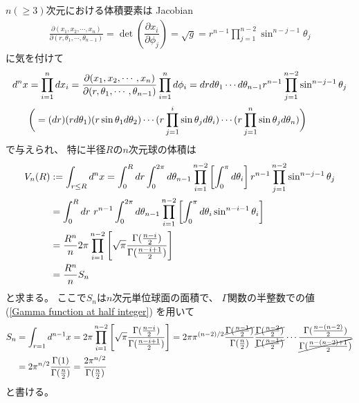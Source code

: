 $n (\ge 3)$次元における体積要素は
Jacobian
\begin{align}
    \frac{\partial(x_1, x_2, \cdots, x_n)}
    {\partial(r, \theta_1, \cdots, \theta_{n-1})}
=
    \det
\left(
    \dfrac{\partial x_i}{\partial \phi_j}
\right)
=
    \sqrt{ g }
=
    r^{n-1}
    \prod_{j = 1}^{n-2}
    \sin^{n - j - 1} \theta_j
\label{jacobian for spherical coordinates}
\end{align}
に気を付けて
\begin{align}
    d^n x
&=
    \prod_{i = 1}^n
    d x_i
=
    \frac{\partial(x_1, x_2, \cdots, x_n)}
    {\partial(r, \theta_1, \cdots, \theta_{n-1})}
    \prod_{i = 1}^n
    d \phi_i
=
    d r d \theta_1
        \cdots d \theta_{n-1}
    r^{n-1}
    \prod_{j = 1}^{n-2}
    \sin^{n - j - 1} \theta_j
\\\notag&
\bigg(
=
    (dr)
    (r d \theta_1)
    (r \sin \theta_1 d \theta_2)
\cdots
    (r \prod_{j = 1}^i
    \sin \theta_j d \theta_i)
\cdots
    (r \prod_{j = 1}^n
    \sin \theta_j d \theta_n)
\bigg)
\end{align}
で与えられ、
特に半径$R$の$n$次元球の体積は
\begin{align}
    V_n(R)
&:=
    \int_{r \le R} d^n x
=
    \int_0^R
        dr
    \int_0^{2 \pi}
        d \theta_{n-1}
    \prod_{i=1}^{n-2}
    \left[
        \int_0^{\pi}
            d \theta_i
    \right]
    r^{n-1}
    \prod_{j = 1}^{n-2}
    \sin^{n - j - 1} \theta_j
\notag\\&
=
    \int_0^R
        dr\ 
    r^{n-1}
    \int_0^{2 \pi}
        d \theta_{n-1}
    \prod_{i=1}^{n-2}
    \left[
        \int_0^{\pi}
            d \theta_i
        \sin^{n - i - 1} \theta_i
    \right]
\notag\\&
=
    \dfrac{R^n}{n}
    2 \pi
    \prod_{i=1}^{n-2}
    \left[
        \sqrt{\pi}
        \dfrac{\Gamma(\frac{n - i}{2})}
        {\Gamma(\frac{n - i + 1}{2})}
    \right]
\notag\\&
=
    \dfrac{R^n}{n}
    S_n
\end{align}
と求まる。
ここで$S_n$は$n$次元単位球面の面積で、
$\Gamma$関数の半整数での値
(\ref{Gamma function at half integer})
を用いて
\begin{align}
    S_n
&=
    \int_{r = 1}
        d^{n-1} x
=
    2 \pi
    \prod_{i=1}^{n-2}
    \left[
        \sqrt{\pi}
        \dfrac{\Gamma(\frac{n - i}{2})}
        {\Gamma(\frac{n - i + 1}{2})}
    \right]
=
    2 \pi
    \pi^{(n-2)/2}
    \dfrac{
        \cancel{
            \Gamma(\frac{n - 1}{2})
        }
    }
        {\Gamma(\frac{n}{2})}
    \dfrac{
        \cancel{
            \Gamma(\frac{n - 2}{2})
        }
    }
        {\cancel{
            \Gamma(\frac{n - 1}{2})
        }}
    \cdots
    \dfrac{\Gamma(\frac{n - (n-2)}{2})}
        {\cancel{
            \Gamma(\frac{n - (n-2) + 1}{2})
        }}
\notag\\&
=
    2
    \pi^{n/2}
    \dfrac{\Gamma(1)}
        {\Gamma(\frac{n}{2})}
=
    \dfrac{ 2 \pi^{n/2} }
        {\Gamma(\frac{n}{2})}
\label{surface area of n dimensional sphere}
\end{align}
と書ける。


